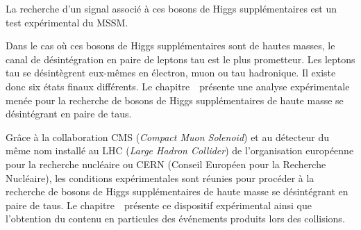 La recherche d'un signal associé à ces bosons de Higgs supplémentaires est un test expérimental du MSSM.
\par Dans le cas où ces bosons de Higgs supplémentaires sont de hautes masses, le canal de désintégration en paire de leptons tau est le plus prometteur.
Les leptons tau se désintègrent eux-mêmes en électron, muon ou tau hadronique.
Il existe donc six états finaux différents.
Le chapitre~\ présente une analyse expérimentale menée pour la recherche de bosons de Higgs supplémentaires de haute masse se désintégrant en paire de taus.
\par Grâce à la collaboration CMS (\emph{Compact Muon Solenoid}) et au détecteur du même nom installé au LHC (\emph{Large Hadron Collider}) de l'organisation européenne pour la recherche nucléaire ou CERN (Conseil Européen pour la Recherche Nucléaire), les conditions expérimentales sont réunies pour procéder à la
recherche de bosons de Higgs supplémentaires de haute masse se désintégrant en paire de taus.
Le chapitre~\ présente ce dispositif expérimental ainsi que l'obtention du contenu en particules des événements produits lors des collisions.